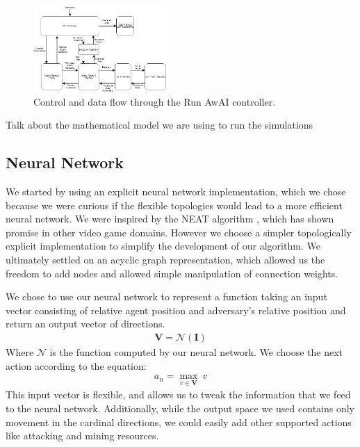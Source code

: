 \documentclass{article}
\begin{document}
\begin{multicols}{2}
\begin{figure}[H]
\centering
\includegraphics[width=0.45\textwidth]{chart}
\begin{changemargin}{0.15in}{0.15in}
  \caption{Control and data flow through the Run AwAI controller.}
\end{changemargin}
\end{figure}

Talk about the mathematical model we are using to run the simulations

\subsection{Neural Network}
We started by using an explicit neural network implementation, which we chose
because we were curious if the flexible topologies would lead to a more
efficient neural network. We were inspired by the NEAT algorithm , which has
shown promise in other video game domains. However we choose a simpler
topologically explicit implementation to simplify the development of our
algorithm. We ultimately settled on an acyclic graph representation, which
allowed us the freedom to add nodes and allowed simple manipulation of
connection weights.

We chose to use our neural network to represent a function taking an input
vector consisting of relative agent position and adversary's relative position
and return an output vector of directions.
\begin{align}
  \bm{V} = \mathcal{N}(\bm{I})
\end{align}
Where $\mathcal{N}$ is the function computed by our neural network. We choose
the next action according to the equation:
\begin{align}
  a_n = \max_{v \in \bm{V}} \: v
\end{align}
This input vector is flexible, and allows us to tweak the information that we
feed to the neural network. Additionally, while the output space we used
contains only movement in the cardinal directions, we could easily add other
supported actions like attacking and mining resources.


\end{multicols}
\end{document}
